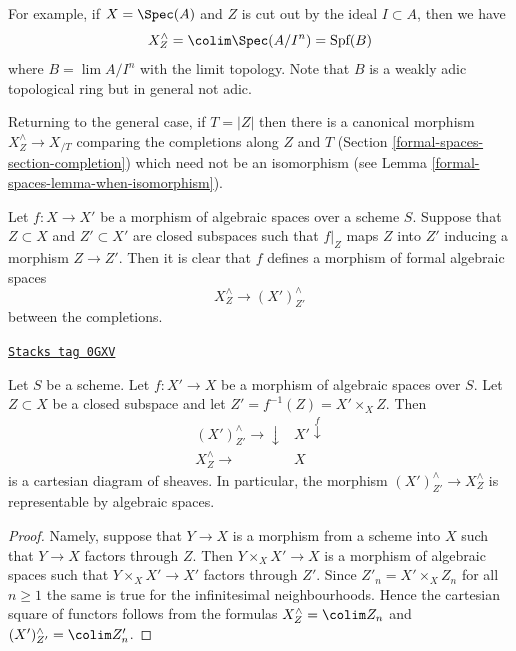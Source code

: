 For example, if $X = \Spec(A)$ and $Z$ is cut out by the ideal $I \subset A$,
then we have
$$
X^\wedge_Z = \colim \Spec(A/I^n) = \text{Spf}(B)
$$
where $B = \lim A/I^n$ with the limit topology. Note that $B$ is a
weakly adic topological ring but in general not adic.

\medskip\noindent
Returning to the general case, if $T = |Z|$ then there is a canonical morphism
$X^\wedge_Z \to X_{/T}$ comparing the completions along $Z$
and $T$ (Section \ref{formal-spaces-section-completion}) which need not be an isomorphism
(see Lemma \ref{formal-spaces-lemma-when-isomorphism}).

\medskip\noindent
Let $f : X \to X'$ be a morphism of algebraic spaces over a scheme $S$.
Suppose that $Z \subset X$ and $Z' \subset X'$ are closed subspaces
such that $f|_Z$ maps $Z$ into $Z'$ inducing a morphism $Z \to Z'$.
Then it is clear that $f$ defines a morphism of formal algebraic spaces
$$
X^\wedge_Z \longrightarrow (X')^\wedge_{Z'}
$$
between the completions.

\begin{lemma}
\label{formal-spaces-lemma-map-completions-subspaces-representable}
\href{https://stacks.math.columbia.edu/tag/0GXV}{\texttt{Stacks tag 0GXV}}

Let $S$ be a scheme. Let $f : X' \to X$ be a morphism
of algebraic spaces over $S$. Let $Z \subset X$
be a closed subspace and let $Z' = f^{-1}(Z) = X' \times_X Z$.
Then
$$
\begin{array}{cc}(X')^\wedge_{Z'} \longrightarrow\downarrow & X' \overset{f}{\downarrow} \\ X^\wedge_Z \longrightarrow & X\end{array}
$$
is a cartesian diagram of sheaves. In particular, the morphism
$(X')^\wedge_{Z'} \to X^\wedge_Z$ is representable by algebraic spaces.
\end{lemma}

\begin{proof}
Namely, suppose that $Y \to X$ is a morphism from a scheme into $X$ such
that $Y \to X$ factors through $Z$. Then $Y \times_X X' \to X$
is a morphism of algebraic spaces such that $Y \times_X X' \to X'$
factors through $Z'$. Since $Z'_n = X' \times_X Z_n$ for all $n \geq 1$
the same is true for the infinitesimal neighbourhoods.
Hence the cartesian square of functors follows
from the formulas $X^\wedge_Z = \colim Z_n$ and
$(X')^\wedge_{Z'} = \colim Z'_n$.
\end{proof}

